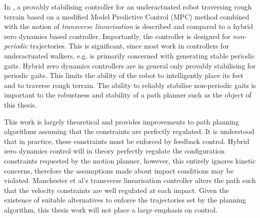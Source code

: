 In \cite{manchester2011stable}, a provably stabilising controller for an underactuated robot traversing rough terrain based on a modified Model Predictive Control (MPC) method combined with the notion of \textit{transverse linearisation} is described and compared to a hybrid zero dynamics based controller. Importantly, the controller is designed for \textit{non-periodic} trajectories. This is significant, since most work in controllers for underactuated walkers, e.g. \cite{martin2014design, sreenath2011compliant, raibert2008bigdog} is primarily concerned with generating stable periodic gaits. Hybrid zero dynamics controllers are in general only provably stabilising for periodic gaits. This limits the ability of the robot to intelligently place its feet and to traverse rough terrain. The ability to reliably stabilise non-periodic gaits is important to the robustness and stability of a path planner such as the object of this thesis. %


This work is largely theoretical and provides improvements to path planning algorithms assuming that the constraints are perfectly regulated. It is understood that in practice, these constraints must be enforced by feedback control. Hybrid zero dynamics control will in theory perfectly regulate the configuration constraints requested by the motion planner, however, this entirely ignores kinetic concerns, therefore the assumptions made about impact conditions may be violated. Manchester et al's \cite{manchester2011stable} transverse linearisation controller alters the path such that the velocity constraints are well regulated at each impact. Given the existence of suitable alternatives to enforce the trajectories set by the planning algorithm, this thesis work will not place a large emphasis on control.